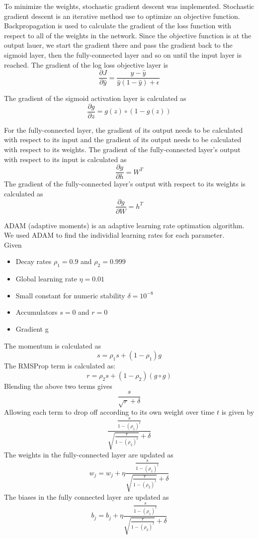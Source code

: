 \noindent To minimize the weights, stochastic gradient descent was implemented. Stochastic gradient descent is an iterative method use to optimize an objective function. Backpropagation is used to calculate the gradient of the loss function with respect to all of the weights in the network. Since the objective function is at the output lauer, we start the gradient there and pass the gradient back to the sigmoid layer, then the fully-connected layer and so on until the input layer is reached. 
The gradient of the log loss objective layer is
$$\frac{\partial J}{\partial \hat{y}} = \frac{y-\hat{y}}{\hat{y}(1-\hat{y})+\epsilon}$$

\noindent The gradient of the sigmoid activation layer is calculated as
$$\frac{\partial g}{\partial z} = g(z) \circ (1-g(z))$$

\noindent For the fully-connected layer, the gradient of its output needs to be calculated with respect to its input and the gradient of its output needs to be calculated with respect to its weights. 
The gradient of the fully-connected layer's output with respect to its input is calculated as
$$\frac{\partial g}{\partial h} = W^T$$
The gradient of the fully-connected layer's output with respect to its weights is calculated as
$$\frac{\partial g}{\partial W} = h^T$$

\noindent ADAM (adaptive moments) is an adaptive learning rate optimation algorithm. We used ADAM to find the individial learning rates for each parameter.\\

\noindent Given 
\begin{itemize}
    \item Decay rates $\rho_1=0.9$ and $\rho_2 = 0.999$ 
    \item Global learning rate $\eta=0.01$
    \item Small constant for numeric stability $\delta=10^{-8}$
    \item Accumulators $s=0$ and $r=0$
    \item Gradient g
\end{itemize}
The momentum is calculated as
$$s=\rho_{1}s + (1-\rho_{1})g$$
The RMSProp term is calculated as:
$$r=\rho_{2}s + (1-\rho_{2})(g\circ g)$$
Blending the above two terms gives
$$\frac{s}{\sqrt{r}+\delta}$$
Allowing each term to drop off according to its own weight over time $t$ is given by
$$\frac{\frac{s}{1-(\rho_{1})^t}}{\sqrt{\frac{r}{1-(\rho_{2})^t}}+\delta}$$
The weights in the fully-connected layer are updated as
$$w_j = w_j + \eta\frac{\frac{s}{1-(\rho_{1})^t}}{\sqrt{\frac{r}{1-(\rho_{2})^t}}+\delta}$$
The biases in the fully connected layer are updated as
$$b_j = b_j + \eta\frac{\frac{s}{1-(\rho_{1})^t}}{\sqrt{\frac{r}{1-(\rho_{2})^t}}+\delta}$$

